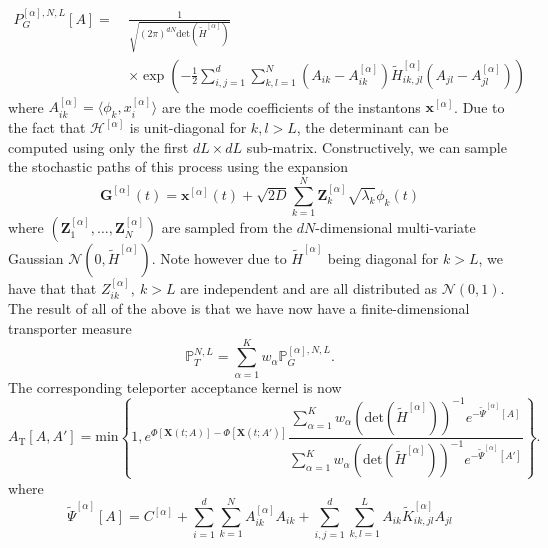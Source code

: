 \begin{equation} \label{eq:discretised teleporter measure}
\begin{aligned}
		P^{[\alpha],N,L}_G[A] =\ & \frac{1}{\sqrt{ (2 \pi)^{dN} \text{det} (\tilde{H}^{[\alpha]}) }}  \\
		& \times \exp \left( -\frac{1}{2} \sum_{i,j=1}^d \sum_{k,l=1}^N (A_{ik} - A^{[\alpha]}_{ik}) \tilde{H}_{ik,jl}^{[\alpha]} (A_{jl} - A^{[\alpha]}_{jl}) \right)
\end{aligned}
\end{equation}
where $A^{[\alpha]}_{ik} = \langle \phi_k, x^{[\alpha]}_i \rangle$ are the mode coefficients of the instantons $\mathbf{x}^{[\alpha]}$. Due to the fact that $\mathcal{H}^{[\alpha]}$ is unit-diagonal for $k,l>L$, the determinant can be computed using only the first $dL \times dL$ sub-matrix. Constructively, we can sample the stochastic paths of this process using the expansion 
\begin{equation} \label{eq:expansion of teleporter paths}
	\mathbf{G}^{[\alpha]}(t) = \mathbf{x}^{[\alpha]}(t) + \sqrt{2D} \sum_{k=1}^{N} \mathbf{Z}_k^{[\alpha]} \sqrt{\lambda_k} \phi_k(t)
\end{equation}
where $(\mathbf{Z}_1^{[\alpha]}, \dots, \mathbf{Z}_N^{[\alpha]})$ are sampled from the $dN$-dimensional multi-variate Gaussian $\mathcal{N}(0, \tilde{H}^{[\alpha]})$. Note however due to $\tilde{H}^{[\alpha]}$ being diagonal for $k>L$, we have that that $Z_{ik}^{[\alpha]},\ k>L$ are independent and are all distributed as $\mathcal{N}(0,1)$. The result of all of the above is that we have now have a finite-dimensional transporter measure
\begin{equation}
	\mathbb{P}_T^{N,L} = \sum_{\alpha=1}^K w_\alpha \mathbb{P}_G^{[\alpha],N,L}.
\end{equation}
The corresponding teleporter acceptance kernel is now
\begin{equation} \label{eq:discretised teleporter acceptance kernel}
	A_\text{T}[A,A'] = \text{min} \left\{
		1,
		e^{\Phi[\mathbf{X}(t;A)] - \Phi[\mathbf{X}(t;A')]}
		\frac{\sum_{\alpha=1}^K w_\alpha (\text{det} (\tilde{H}^{[\alpha]}))^{-1} e^{ - \tilde{\Psi}^{[\alpha]}[A] } }{ \sum_{\alpha=1}^K w_\alpha (\text{det} (\tilde{H}^{[\alpha]}))^{-1} e^{ - \tilde{\Psi}^{[\alpha]}[A'] } }
	\right\}.
\end{equation}
where
\begin{equation} \label{eq:tilde Psi}
	\tilde{\Psi}^{[\alpha]}[A] = C^{[\alpha]} + \sum_{i=1}^{d} \sum_{k=1}^N A^{[\alpha]}_{ik} A_{ik} + \sum_{i,j=1}^d \sum_{k,l=1}^L A_{ik} \tilde{K}^{[\alpha]}_{ik,jl} A_{jl}
\end{equation}
